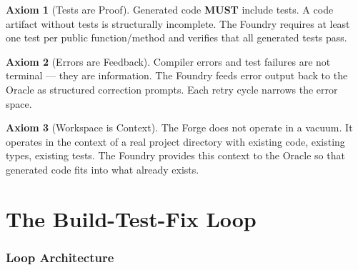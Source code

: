 \documentclass[11pt,a4paper,twoside]{article}
\theoremstyle{definition}
\newtheorem{axiom}{Axiom}[section]
\theoremstyle{plain}
\theoremstyle{remark}
\begin{document}
\begin{axiom}[Tests are Proof]\label{ax:tests}
Generated code \textbf{MUST} include tests. A code artifact without
tests is structurally incomplete. The Foundry requires at least one
test per public function/method and verifies that all generated tests
pass.
\end{axiom}

\begin{axiom}[Errors are Feedback]\label{ax:feedback}
Compiler errors and test failures are not terminal — they are
information. The Foundry feeds error output back to the Oracle as
structured correction prompts. Each retry cycle narrows the error
space.
\end{axiom}

\begin{axiom}[Workspace is Context]\label{ax:workspace}
The Forge does not operate in a vacuum. It operates in the context
of a real project directory with existing code, existing types,
existing tests. The Foundry provides this context to the Oracle
so that generated code fits into what already exists.
\end{axiom}


\part{The Build-Test-Fix Loop}\label{part:loop}

\section{Loop Architecture}\label{sec:looparch}
\end{document}
